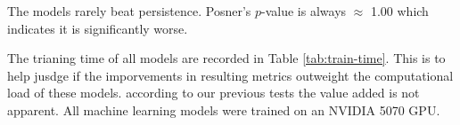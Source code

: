 The models rarely beat persistence. Posner's $p$-value is always $\approx$ 1.00 which indicates it is significantly worse.




The trianing time of all models are recorded in Table \ref{tab:train-time}. This is to help jusdge if the imporvements in resulting metrics outweight the computational load of these models. 
according to our previous tests the value added is not apparent. All machine learning models were trained on an NVIDIA 5070 GPU.

